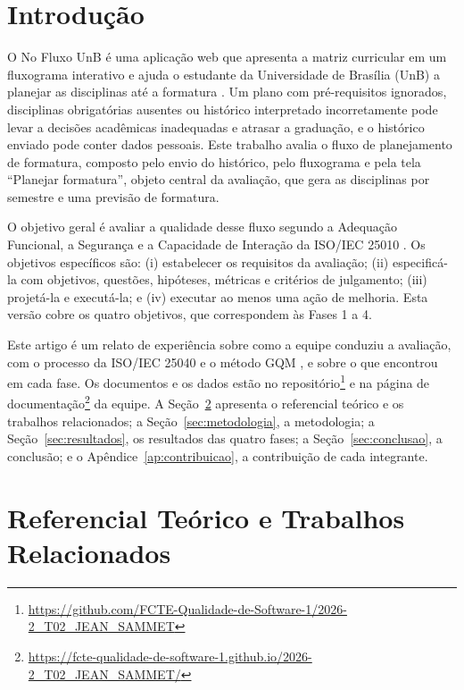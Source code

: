 \documentclass[12pt]{article}
\begin{document}
\section{Introdução}\label{sec:introducao}

O No Fluxo UnB é uma aplicação web que apresenta a matriz curricular em um
fluxograma interativo e ajuda o estudante da Universidade de Brasília (UnB) a
planejar as disciplinas até a formatura \cite{nofluxo2026site,nofluxo2026repo}. Um
plano com pré-requisitos ignorados, disciplinas obrigatórias ausentes ou histórico
interpretado incorretamente pode levar a decisões acadêmicas inadequadas e atrasar a
graduação, e o histórico enviado pode conter dados pessoais. Este trabalho avalia o
fluxo de planejamento de formatura, composto pelo envio do histórico, pelo
fluxograma e pela tela ``Planejar formatura'', objeto central da avaliação, que gera
as disciplinas por semestre e uma previsão de formatura.

O objetivo geral é avaliar a qualidade desse fluxo segundo a Adequação Funcional, a
Segurança e a Capacidade de Interação da ISO/IEC 25010 \cite{iso25010}. Os objetivos específicos
são: (i) estabelecer os requisitos da avaliação; (ii) especificá-la com objetivos,
questões, hipóteses, métricas e critérios de julgamento; (iii) projetá-la e
executá-la; e (iv) executar ao menos uma ação de melhoria. Esta versão cobre os
quatro objetivos, que correspondem às Fases 1 a 4.

Este artigo é um relato de experiência sobre como a equipe conduziu a avaliação, com
o processo da ISO/IEC 25040 \cite{iso25040} e o método GQM \cite{basili1994gqm}, e
sobre o que encontrou em cada fase. Os documentos e os dados estão no
repositório\footnote{\url{https://github.com/FCTE-Qualidade-de-Software-1/2026-2_T02_JEAN_SAMMET}}
e na página de
documentação\footnote{\url{https://fcte-qualidade-de-software-1.github.io/2026-2_T02_JEAN_SAMMET/}}
da equipe. A Seção~\ref{sec:referencial} apresenta o referencial teórico e os
trabalhos relacionados; a Seção~\ref{sec:metodologia}, a metodologia; a
Seção~\ref{sec:resultados}, os resultados das quatro fases; a
Seção~\ref{sec:conclusao}, a conclusão; e o Apêndice~\ref{ap:contribuicao}, a contribuição de cada
integrante.

\section{Referencial Teórico e Trabalhos Relacionados}\label{sec:referencial}
\end{document}
